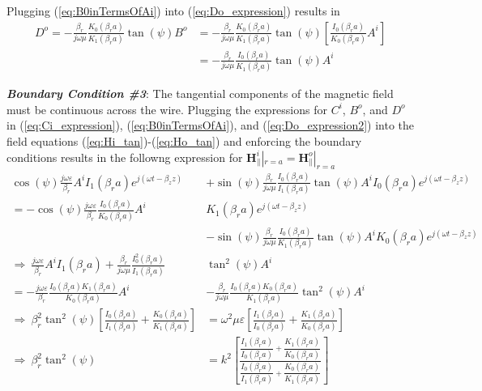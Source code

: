Plugging (\ref{eq:B0inTermsOfAi}) into (\ref{eq:Do_expression}) results in 
\begin{equation}
	\begin{split}
		D^o = -\frac{\beta_r}{j\omega\mu}\frac{K_0(\beta_r a)}{K_1(\beta_r a)}\tan(\psi) B^o &= -\frac{\beta_r}{j\omega\mu}\frac{K_0(\beta_r a)}{K_1(\beta_r a)}\tan(\psi) \left[\frac{I_0(\beta_r a)}{K_0(\beta_r a)}A^{i} \right] \\[2pt] 
		&= -\frac{\beta_r}{j\omega\mu}\frac{I_0(\beta_r a)}{K_1(\beta_r a)}\tan(\psi) A^i
	\end{split}
	\label{eq:Do_expression2}
\end{equation}

\hspace*{2em} \textit{\textbf{Boundary Condition \#3}}: The tangential components of the magnetic field must be continuous across the wire. Plugging the expressions for $C^i$, $B^o$, and $D^o$ in (\ref{eq:Ci_expression}), (\ref{eq:B0inTermsOfAi}), and (\ref{eq:Do_expression2}) into the field equations (\ref{eq:Hi_tan})-(\ref{eq:Ho_tan}) and enforcing the boundary conditions results in the followng expression for $\mathbf{H}_{\parallel}^{i}|_{r=a}=\mathbf{H}_{\parallel}^{o}|_{r=a}$
\begin{equation}
	\begin{aligned}
		\cos\left(\psi\right)\frac{j\omega\varepsilon}{\beta_r} A^i I_1(\beta_r a) e^{j(\omega t - \beta_z z)} 
		&+ \sin\left(\psi\right)\frac{\beta_r}{j\omega\mu} \frac{I_0(\beta_r a)}{I_1(\beta_r a)} \tan\left(\psi\right) A^i I_0(\beta_r a) e^{j(\omega t - \beta_z z)} \\
		= -\cos\left(\psi\right)\frac{j\omega\varepsilon}{\beta_r} \frac{I_0(\beta_r a)}{K_0(\beta_r a)} A^i &K_1(\beta_r a) e^{j(\omega t - \beta_z z)} \\
		&- \sin\left(\psi\right)\frac{\beta_r}{j\omega\mu} \frac{I_0(\beta_r a)}{K_1(\beta_r a)} \tan\left(\psi\right) A^i K_0(\beta_r a) e^{j(\omega t - \beta_z z)} \\[2pt]
		\Rightarrow\ 
		\frac{j\omega\varepsilon}{\beta_r} A^i I_1(\beta_r a) + \frac{\beta_r}{j\omega\mu} \frac{I_0^2(\beta_r a)}{I_1(\beta_r a)} &\tan^2\left(\psi\right) A^i \\[4pt]
		= -\frac{j\omega\varepsilon}{\beta_r} \frac{I_0(\beta_r a)K_1(\beta_r a)}{K_0(\beta_r a)} A^i &- \frac{\beta_r}{j\omega\mu} \frac{I_0(\beta_r a) K_0(\beta_r a)}{K_1(\beta_r a)} \tan^2\left(\psi\right) A^i \\[4pt]
		\Rightarrow\ 
		\beta_r^2 \tan^2\left(\psi\right) \left[ \frac{I_0(\beta_r a)}{I_1(\beta_r a)} + \frac{K_0(\beta_r a)}{K_1(\beta_r a)} \right]
		&= \omega^2 \mu \varepsilon \left[ \frac{I_1(\beta_r a)}{I_0(\beta_r a)} + \frac{K_1(\beta_r a)}{K_0(\beta_r a)} \right] \\[4pt]
		\Rightarrow\ 
		\beta_r^2 \tan^2\left(\psi\right) &= k^2 \left[\frac{ \dfrac{I_1(\beta_r a)}{I_0(\beta_r a)} + \dfrac{K_1(\beta_r a)}{K_0(\beta_r a)} }
		{ \dfrac{I_0(\beta_r a)}{I_1(\beta_r a)} + \dfrac{K_0(\beta_r a)}{K_1(\beta_r a)} }\right]
	\end{aligned}
	\label{eq:transcendental1}
\end{equation}
